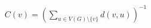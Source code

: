 \documentclass[preview]{standalone}
\begin{document}
\begin{align*}
C(v) = \left( \sum_{u \in V(G) \setminus \{v\}} d(v, u) \right)^{-1}
\end{align*}
\end{document}
